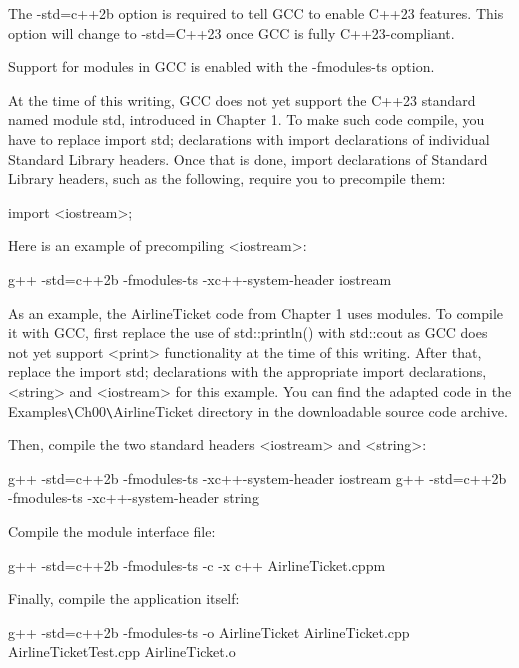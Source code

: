 The -std=c++2b option is required to tell GCC to enable C++23 features. This option will change to -std=C++23 once GCC is fully C++23-compliant.


Support for modules in GCC is enabled with the -fmodules-ts option.

At the time of this writing, GCC does not yet support the C++23 standard named module std, introduced in Chapter 1. To make such code compile, you have to replace import std; declarations with import declarations of individual Standard Library headers. Once that is done, import declarations of Standard Library headers, such as the following, require you to precompile them:

\begin{cpp}
import <iostream>;
\end{cpp}

Here is an example of precompiling <iostream>:

\begin{shell}
g++ -std=c++2b -fmodules-ts -xc++-system-header iostream
\end{shell}

As an example, the AirlineTicket code from Chapter 1 uses modules. To compile it with GCC, first replace the use of std::println() with std::cout as GCC does not yet support <print> functionality at the time of this writing. After that, replace the import std; declarations with the appropriate import declarations, <string> and <iostream> for this example. You can find the adapted code in the Examples\verb|\|Ch00\verb|\|AirlineTicket directory in the downloadable source code archive.

Then, compile the two standard headers <iostream> and <string>:

\begin{shell}
g++ -std=c++2b -fmodules-ts -xc++-system-header iostream
g++ -std=c++2b -fmodules-ts -xc++-system-header string
\end{shell}

Compile the module interface file:

\begin{shell}
g++ -std=c++2b -fmodules-ts -c -x c++ AirlineTicket.cppm
\end{shell}

Finally, compile the application itself:

\begin{shell}
g++ -std=c++2b -fmodules-ts -o AirlineTicket AirlineTicket.cpp AirlineTicketTest.cpp AirlineTicket.o
\end{shell}

